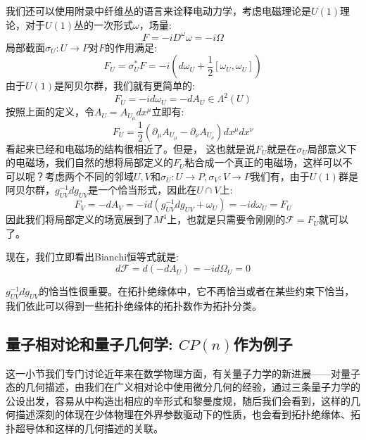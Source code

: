 \documentclass[supercite]{HustGraduPaper}
\begin{document}
我们还可以使用附录中纤维丛的语言来诠释电动力学，考虑电磁理论是$U(1)$理论，对于$U(1)$丛的一次形式$\omega$，场量:
\begin{equation}
F = - iD^\omega \omega = -i \Omega
\end{equation}
局部截面$\sigma_U: U \to P$对$F$的作用满足:
\begin{equation}
F_U = \sigma^*_U F = -i(d\omega_U + \frac{1}{2}[\omega_U, \omega_U])
\end{equation}
由于$U(1)$是阿贝尔群，我们就有更简单的:
\begin{equation}
F_U = -id\omega_U = -dA_U \in \Lambda^2(U)
\end{equation}
按照上面的定义，令$A_U = A_{U_\mu} dx^\mu$立即有:
\begin{equation}
F_U = \frac{1}{2}(\partial_\mu A_{U_\mu} -\partial_\nu A_{U_\nu}) dx^\mu dx^\nu
\end{equation}
看起来已经和电磁场的结构很相近了。但是，
这也就是说$F_U$就是在$\sigma_U$局部意义下的电磁场，我们自然的想将局部定义的$F_U$粘合成一个真正的电磁场，这样可以不可以呢？考虑两个不同的邻域$U,V$和$\sigma_U :U\to P, \sigma_V: V\to P$我们有，由于$U(1)$群是阿贝尔群，$g_{UV}^{-1}dg_{UV}$是一个恰当形式，因此在$U \cap V$上:
\begin{equation}
F_V = -dA_V = -id(g_{UV}^{-1}dg_{UV}+\omega_U) = -id\omega_U =F_U
\end{equation}
因此我们将局部定义的场宽展到了$M^4$上，也就是只需要令刚刚的$\mathcal{F} = F_U$就可以了。

现在，我们立即看出Bianchi恒等式就是:
\begin{equation}
d\mathcal{F} = d(-dA_U) = -id\Omega_U = 0
\end{equation}

$g_{UV}^{-1}dg_{UV}$的恰当性很重要。在拓扑绝缘体中，它不再恰当或者在某些约束下恰当，我们依此可以得到一些拓扑绝缘体的拓扑数作为拓扑分类。

	\subsection{量子相对论和量子几何学: $CP(n)$作为例子\label{sub2}}	
	这一小节我们专门讨论近年来在数学物理方面，有关量子力学的新进展——对量子态的几何描述，由我们在广义相对论中使用微分几何的经验，通过三条量子力学的公设出发，容易从中构造出相应的辛形式和黎曼度规\cite{minic2004general,provost1980riemannian}，随后我们会看到，这样的几何描述深刻的体现在少体物理在外界参数驱动下的性质，也会看到拓扑绝缘体、拓扑超导体和这样的几何描述的关联。
	
	
\end{document}
